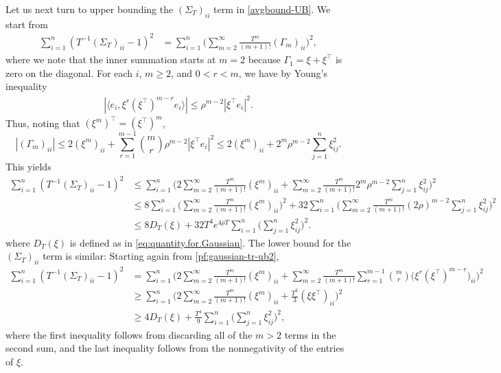 \documentclass[11pt,reqno]{amsart}
\numberwithin{equation}{section}
\theoremstyle{definition}
\def\BB{{\Gamma}}
\begin{document}
Let us next turn to upper bounding the $(\Sigma_T)_{ii}$ term in \eqref{avgbound-UB}. We start from
\begin{align}
\sum_{i=1}^n (T^{-1}(\Sigma_T)_{ii}-1)^2 &= \sum_{i=1}^n   \bigg(\sum_{m=2}^{\infty} \frac{T^m}{(m+1)!} (\BB_m )_{ii}\bigg)^2,   \label{pf:gaussian-tr-ub2} 
\end{align}
where we note that the inner summation starts at $m=2$ because $\Gamma_1=\xi+\xi^\top$ is zero on the diagonal. 
For each $i$, $m \ge 2$, and $0 < r < m$,  we have  by Young's inequality
\begin{align*}
	|\langle e_i, \xi^r (\xi^\top)^{m-r} e_i\rangle  | \le \rho^{m-2} |\xi^\top e_i|^2.
\end{align*}
Thus, noting that $(\xi^m)^\top = (\xi^\top)^m$, 
\begin{equation*}
	|(\BB_m)_{ii}| \le 2 (\xi^m)_{ii} +  \sum_{r=1}^{m-1} {m \choose r}\rho^{m-2} |\xi^\top e_i|^2 \le  2 (\xi^m)_{ii}  +  2^m \rho^{m-2}  \sum_{j=1}^n\xi_{ij}^2.
\end{equation*}
This yields
\begin{align}
\sum_{i=1}^n (T^{-1}(\Sigma_T)_{ii}-1)^2 &\le  \sum_{i=1}^n  \bigg( 2\sum_{m=2}^{\infty} \frac{T^m}{(m+1)!} (\xi^m)_{ii} +  \sum_{m=2}^{\infty} \frac{T^m}{(m+1)!}  2^m\rho^{ m-2 }\sum_{j=1}^n \xi_{ij}^2 \bigg)^2 \nonumber \\
&\le 8  \sum_{i=1}^n \bigg(\sum_{m=2}^{\infty} \frac{T^m}{(m+1)!} (\xi^m)_{ii} \bigg)^2 + 32\sum_{i=1}^n \bigg(\sum_{m=2}^{\infty} \frac{T^m}{(m+1)!}  (2\rho)^{ m-2}\sum_{j=1}^n \xi_{ij}^2\bigg)^2 \nonumber\\
	&\le 8 D_T(\xi) + 32 T^4 e^{4\rho T}\sum_{i=1}^n\bigg(\sum_{j=1}^n\xi_{ij}^2\bigg)^2 . \label{pf:gaussian-ubfinal2}
\end{align}
where $D_T(\xi)$ is defined as in \eqref{eq:quantity.for.Gaussian}. The lower bound for the $(\Sigma_T)_{ii}$ term is similar: Starting again from \eqref{pf:gaussian-tr-ub2}, 
\begin{align}
	\sum_{i=1}^n (T^{-1}(\Sigma_T)_{ii}-1)^2 & = \sum_{i=1}^{n}  \bigg(2\sum_{m=2}^{\infty} \frac{T^m}{(m+1)!} (\xi^m)_{ii} + \sum_{m=2}^\infty \frac{T^m}{(m+1)!} \sum_{r=1}^{m-1} \binom{m}{r} \big(\xi^r (\xi^\top)^{m-r}\big)_{ii}\bigg)^2 \nonumber\\
	&\ge \sum_{i=1}^{n}  \bigg(2\sum_{m=2}^{\infty} \frac{T^m}{(m+1)!} (\xi^m)_{ii} + \frac{T^2}{3} (\xi \xi^\top)_{ii}\bigg)^2 \nonumber\\
	&\ge 4  D_T(\xi) + \frac{T^4}{9}\sum_{i=1}^n \bigg(\sum_{j=1}^{n} \xi_{ij}^2\bigg)^2, \label{pf:gaussian-lbfinal2}
\end{align}
where the first inequality follows from discarding all of the $m > 2$ terms in the second sum, and the last inequality follows from the nonnegativity of the entries of $\xi$. 
\end{document}
